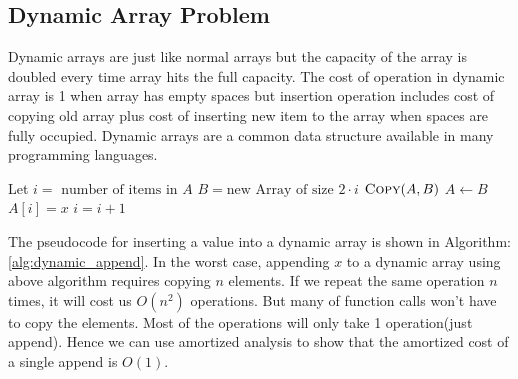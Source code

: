 \documentclass[11pt]{article}
\theoremstyle{definition}
\newenvironment{myindentpar}[1]%
  {\begin{list}{}%
          {\setlength{\leftmargin}{#1}}%
          \item[]%
  }
  {\end{list}}
\begin{document}
\subsection{Dynamic Array Problem}
Dynamic arrays are just like normal arrays but the capacity of the array is doubled every time array hits the full capacity. The cost of  operation in dynamic array is 1 when array has empty spaces but insertion operation includes cost of copying old array plus cost of inserting new item to the array when spaces are fully occupied. Dynamic arrays are a common data structure available in many programming languages.\\

\begin{algorithm}
\caption{}
\label{alg:dynamic_append}
\begin{algorithmic}[1]
\State Let $i = \text{ number of items in }A$
  \State $B = \text{new Array of size } 2\cdot i$
  \State $\Call{Copy}{A, B}$
  \State $A \leftarrow B$
\EndIf
\State $A[i] = x$
\State $i = i+1$
\end{algorithmic}
\end{algorithm}

The pseudocode for inserting a value into a dynamic array is shown in Algorithm: \ref{alg:dynamic_append}.
In the worst case, appending $x$ to a dynamic array using above algorithm requires copying $n$ elements. If we repeat the same operation $n$ times, it will cost us $O(n^2)$ operations. But many of  function calls won't have to copy the elements. Most of the operations will only take 1 operation(just append). Hence we can use amortized analysis to show that the amortized cost of a single append is $O(1)$.

\end{document}
